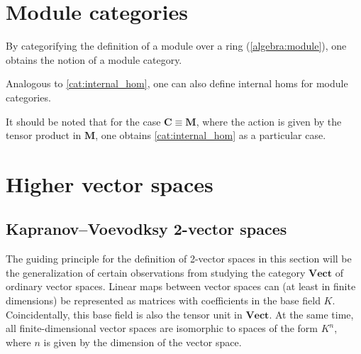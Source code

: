 \section{Module categories}

    By categorifying the definition of a module over a ring (\cref{algebra:module}), one obtains the notion of a module category.

    Analogous to \cref{cat:internal_hom}, one can also define internal homs for module categories.
    \begin{property}
        It should be noted that for the case $\mathbf{C}\equiv\mathbf{M}$, where the action is given by the tensor product in $\mathbf{M}$, one obtains \cref{cat:internal_hom} as a particular case.
    \end{property}

\section{Higher vector spaces}
\subsection{Kapranov--Voevodksy 2-vector spaces}

    The guiding principle for the definition of 2-vector spaces in this section will be the generalization of certain observations from studying the category $\mathbf{Vect}$ of ordinary vector spaces. Linear maps between vector spaces can (at least in finite dimensions) be represented as matrices with coefficients in the base field $K$. Coincidentally, this base field is also the tensor unit in $\mathbf{Vect}$. At the same time, all finite-dimensional vector spaces are isomorphic to spaces of the form $K^n$, where $n$ is given by the dimension of the vector space.

